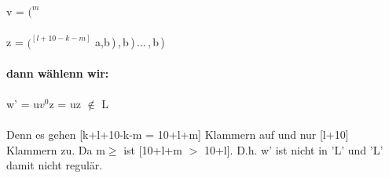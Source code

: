 \documentclass{article}
\begin{document}
		\noindent \hspace*{1cm}v = $(^m$\\ \\
		\noindent \hspace*{1cm}z = $(^{[l+10-k-m]}$
		\hspace{3mm}a\hspace{3mm},b\,)\,,\,b\,)\,...\,,\,b\,)\\\\
		\textbf{dann w\"ahlenn wir:}\\\\
			\noindent \hspace*{1cm}	w' = u$v^0$z = uz $\notin$ L\\\\
		Denn es gehen [k+l+10-k-m = 10+l+m] Klammern auf und nur [l+10] Klammern zu. 
		Da m$\geq$ ist [10+l+m $>$ 10+l].
		D.h. w' ist nicht in 'L' und 'L' damit nicht regul\"ar.
\end{document}
